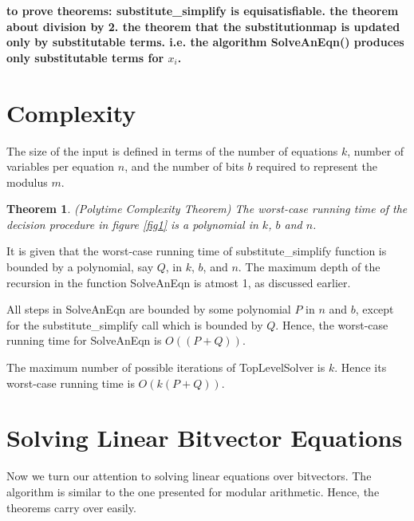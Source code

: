 \documentclass{article}
\newtheorem{theorem}{Theorem}[section]
\newenvironment{proof}[1][Proof]{\begin{trivlist}
\item[\hskip \labelsep {\bfseries #1}]}{\end{trivlist}}
\newcommand{\qed}{\nobreak \ifvmode \relax \else
  \ifdim\lastskip<1.5em \hskip-\lastskip
  \hskip1.5em plus0em minus0.5em \fi \nobreak
  \vrule height0.75em width0.5em depth0.25em\fi}
\begin{document}
\textbf{to prove theorems: substitute\_simplify is equisatisfiable.  the
theorem about division by 2. the theorem that the substitutionmap is
updated only by substitutable terms. i.e. the algorithm SolveAnEqn()
produces only substitutable terms for $x_i$.}

\section{Complexity}

The size of the input is defined in terms of the number of equations
$k$, number of variables per equation $n$, and the number of bits $b$
required to represent the modulus $m$.

\begin{theorem}
\emph{(Polytime Complexity Theorem)}
\label{complexity}
The worst-case running time of the decision procedure in figure
\ref{fig1} is a polynomial in $k$, $b$ and $n$.
\end{theorem}

\begin{proof}
It is given that the worst-case running time of substitute\_simplify
function is bounded by a polynomial, say $Q$, in $k$, $b$, and
$n$. The maximum depth of the recursion in the function SolveAnEqn is
atmost 1, as discussed earlier.

All steps in SolveAnEqn are bounded by some polynomial $P$ in $n$ and
$b$, except for the substitute\_simplify call which is bounded by
$Q$. Hence, the worst-case running time for SolveAnEqn is
$O((P+Q))$.

The maximum number of possible iterations of TopLevelSolver is
$k$. Hence its worst-case running time is $O(k(P+Q))$.
\qed
\end{proof}

\section{Solving Linear Bitvector Equations}
Now we turn our attention to solving linear equations over
bitvectors. The algorithm is similar to the one presented for modular
arithmetic. Hence, the theorems carry over easily.
\end{document}
